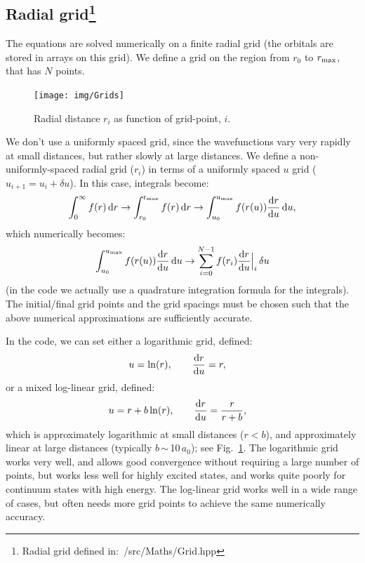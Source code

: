 \documentclass[10pt,twocolumn,a4paper]{article}%
\newcommand{\be}{\begin{equation}}
\newcommand{\ee}{\end{equation}}
\def\d{\ensuremath{{\rm d}}}
\begin{document}
\subsection[Radial grid]{Radial grid\label{sec:grid}\footnote{Radial grid defined in:~/src/Maths/Grid.hpp}}

The equations are solved numerically on a finite radial grid (the orbitals are stored in arrays on this grid).
We define a grid on the region from $r_0$ to $r_{\rm max}$, that has $N$ points.

\begin{figure}
\centering
\texttt{[image: img/Grids]}
\caption{\small Radial distance $r_i$ as function of grid-point, $i$.\label{Fig:grids}}
\end{figure}



We don't use a uniformly spaced grid, since the wavefunctions vary very rapidly at small distances, but rather slowly at large distances.
We define a non-uniformly-spaced radial grid ($r_i$) in terms of a uniformly spaced $u$ grid ($u_{i+1}=u_i+\delta u$).
In this case, integrals become:
\be
\int_{0}^{\infty} f(r)\,\d r \to 
\int_{r_0}^{\rm r_{max}} f(r)\,\d r \to 
\int_{u_0}^{u_{\rm max}} f(r(u))\frac{\d r}{\d u}\,\d u,
\ee
which numerically becomes:
\be
\int_{u_0}^{u_{\rm max}} f(r(u))\frac{\d r}{\d u}\,\d u \to
\sum_{i=0}^{N-1} f(r_i)\frac{\d r}{\d u}\Big|_i\,\delta u
\ee
(in the code we actually use a quadrature integration formula for the integrals).
The initial/final grid points and the grid spacings must be chosen such that the above numerical approximations are sufficiently accurate.

In the code, we can set either a logarithmic grid, defined:
\begin{align}
u &= \ln(r), \qquad
\frac{\d r}{\d u} = r,
\end{align}
or a mixed log-linear grid, defined: 
\begin{align}
u &= r + b \ln(r), \qquad
\frac{\d r}{\d u} = \frac{r}{r + b},
\end{align}
which is approximately logarithmic at small distances ($r<b$), and approximately linear at large distances (typically $b$\,$\sim$\,10\,$a_0$); see Fig.~\ref{Fig:grids}.
The logarithmic grid works very well, and allows good convergence without requiring a large number of points, but works less well for highly excited states, and works quite poorly for continuum states with high energy.
The log-linear grid works well in a wide range of cases, but often needs more grid points to achieve the same numerically accuracy.
\end{document}
